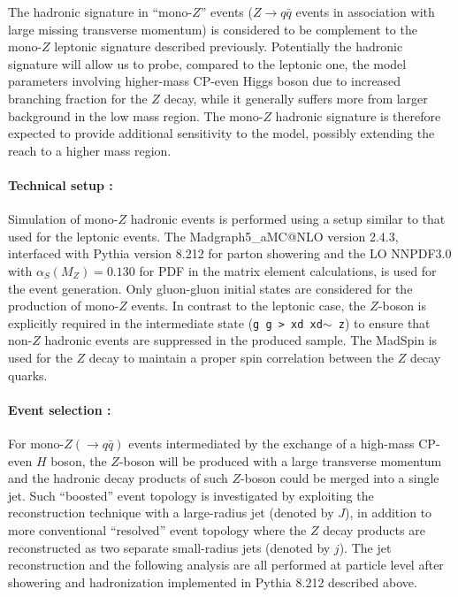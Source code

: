 The hadronic signature in ``mono-$Z$'' events ($Z \to q\bar{q}$ events in association with 
large missing transverse momentum) 
is considered to be complement to the mono-$Z$ leptonic signature described previously.
Potentially the hadronic signature will allow us to probe, compared to the leptonic one, 
the model parameters involving higher-mass CP-even Higgs boson 
due to increased branching fraction for the $Z$ decay,
while it generally suffers more from larger background in the low mass region.
The mono-$Z$ hadronic signature is therefore expected to provide additional sensitivity to the model, possibly 
extending the reach to a higher mass region.

\paragraph{Technical setup :}
Simulation of mono-$Z$ hadronic events is performed using a setup similar to that used for the leptonic events. 
The Madgraph5\_aMC@NLO version 2.4.3, interfaced with Pythia version 8.212 for parton showering 
and the LO NNPDF3.0 with $\alpha_{S}(M_{Z}) = 0.130$ for PDF in the matrix element calculations, 
is used for the event generation. 
Only gluon-gluon initial states are considered for the production of mono-$Z$ events. 
In contrast to the leptonic case, the $Z$-boson is explicitly required in the intermediate state ({\tt g g > xd xd$\sim$ z}) 
to ensure that non-$Z$ hadronic events are suppressed in the produced sample. 
The MadSpin is used for the $Z$ decay to maintain a proper spin correlation between the $Z$ decay quarks.
 
\paragraph{Event selection :} 
For mono-$Z (\to q\bar{q})$ events intermediated by the exchange of a high-mass CP-even $H$ boson, 
the $Z$-boson will be produced with 
a large transverse momentum and the hadronic decay products of such $Z$-boson could be merged into a single jet. 
Such ``boosted'' event topology is investigated by exploiting the reconstruction technique with 
a large-radius jet (denoted by $J$), 
in addition to more conventional ``resolved'' event topology where the $Z$ decay products are reconstructed 
as two separate
small-radius jets (denoted by $j$). The jet reconstruction and the following analysis are all performed at particle level
after showering and hadronization implemented in Pythia 8.212 described above.

